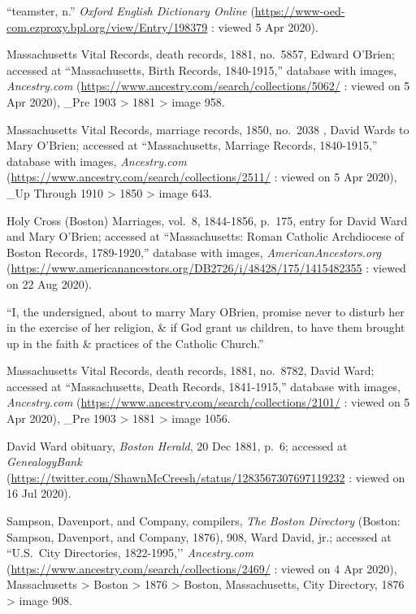 \begin{thebibliography}{999}
	``teamster, n.'' \textit{Oxford English Dictionary Online} (\url{https://www-oed-com.ezproxy.bpl.org/view/Entry/198379} : viewed 5 Apr 2020).
	
	Massachusetts Vital Records, death records, 1881, no.\ 5857, Edward O'Brien; accessed at ``Massachusetts, Birth Records, 1840-1915,'' database with images, \textit{Ancestry.com} (\url{https://www.ancestry.com/search/collections/5062/} : viewed on 5 Apr 2020), \_Pre 1903 > 1881 > image 958.
	
	Massachusetts Vital Records, marriage records, 1850, no.\ 2038 , David Wards to Mary O'Brien; accessed at ``Massachusetts, Marriage Records, 1840-1915,'' database with images, \textit{Ancestry.com} (\url{https://www.ancestry.com/search/collections/2511/} : viewed on 5 Apr 2020), \_Up Through 1910 > 1850 > image 643.
	
	Holy Cross (Boston) Marriages, vol.\ 8, 1844-1856, p.\ 175, entry for David Ward and Mary O'Brien; accessed at ``Massachusetts: Roman Catholic Archdiocese of Boston Records, 1789-1920,'' database with images, \textit{AmericanAncestors.org} (\url{https://www.americanancestors.org/DB2726/i/48428/175/1415482355} : viewed on 22 Aug 2020).
	
	``I, the undersigned, about to marry Mary OBrien, promise never to disturb her in the exercise of her religion, \& if God grant us children, to have them brought up in the faith \& practices of the Catholic Church.''
	
	Massachusetts Vital Records, death records, 1881, no.\ 8782, David Ward; accessed at ``Massachusetts, Death Records, 1841-1915,'' database with images, \textit{Ancestry.com} (\url{https://www.ancestry.com/search/collections/2101/} : viewed on 5 Apr 2020), \_Pre 1903 > 1881 > image 1056.
	
	David Ward obituary, \textit{Boston Herald}, 20 Dec 1881, p.\ 6; accessed at \textit{GenealogyBank} (\url{https://twitter.com/ShawnMcCreesh/status/1283567307697119232} : viewed on 16 Jul 2020).
	
	
	Sampson, Davenport, and Company, compilers, \textit{The Boston Directory} (Boston: Sampson, Davenport, and Company, 1876), 908, Ward David, jr.; accessed at ``U.S.\ City Directories, 1822-1995,’’ \textit{Ancestry.com} (\url{https://www.ancestry.com/search/collections/2469/} : viewed on 4 Apr 2020), Massachusetts > Boston > 1876 > Boston, Massachusetts, City Directory, 1876 > image 908.
	

\end{thebibliography}

